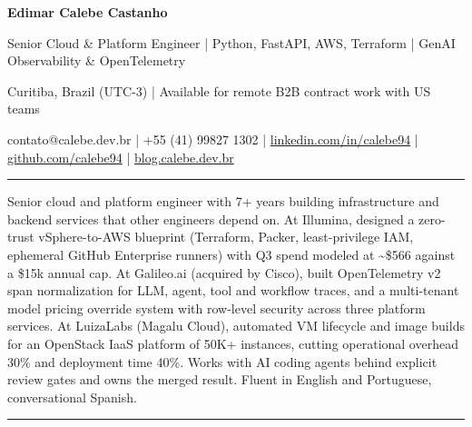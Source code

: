 \documentclass[11pt,letterpaper]{article}
\newcommand{\resumesection}[1]{%
  \vspace{8pt}{\large\bfseries #1}\par\vspace{2pt}\hrule\vspace{4pt}}
\begin{document}
\begin{center}
{\LARGE\bfseries Edimar Calebe Castanho}\par\vspace{3pt}
Senior Cloud \& Platform Engineer | Python, FastAPI, AWS, Terraform | GenAI Observability \& OpenTelemetry\par\vspace{3pt}
Curitiba, Brazil (UTC-3) | Available for remote B2B contract work with US teams\par\vspace{3pt}
contato@calebe.dev.br | +55 (41) 99827 1302 | \href{https://www.linkedin.com/in/calebe94}{linkedin.com/in/calebe94} | \href{https://github.com/calebe94}{github.com/calebe94} | \href{https://blog.calebe.dev.br/}{blog.calebe.dev.br}
\end{center}

\resumesection{Summary}
Senior cloud and platform engineer with 7+ years building infrastructure and backend services that other engineers depend on.
At Illumina, designed a zero-trust vSphere-to-AWS blueprint (Terraform, Packer, least-privilege IAM, ephemeral GitHub Enterprise runners) with Q3 spend modeled at \textasciitilde\$566 against a \$15k annual cap.
At Galileo.ai (acquired by Cisco), built OpenTelemetry v2 span normalization for LLM, agent, tool and workflow traces, and a multi-tenant model pricing override system with row-level security across three platform services.
At LuizaLabs (Magalu Cloud), automated VM lifecycle and image builds for an OpenStack IaaS platform of 50K+ instances, cutting operational overhead 30\% and deployment time 40\%.
Works with AI coding agents behind explicit review gates and owns the merged result.
Fluent in English and Portuguese, conversational Spanish.

\resumesection{Professional Experience}
\end{document}
